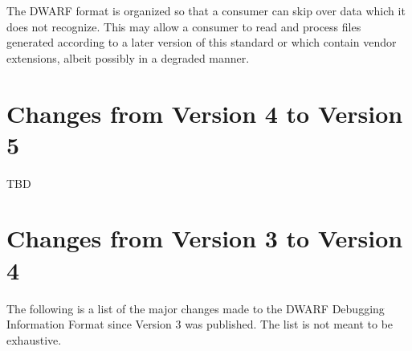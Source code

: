 The DWARF format is organized so that a consumer can skip over
data which it does not recognize. 
This may allow a consumer
to read and process files generated according to a later
version of this standard or which contain vendor extensions,
albeit possibly in a degraded manner.


\section[Changes Version 4 to 5]{Changes from Version 4 to Version 5}
TBD
\section[Changes Version 3 to 4]{Changes from Version 3 to Version 4}
The following is a list of the major changes made to the DWARF Debugging Information
Format since Version 3 was published. The list is not meant to be exhaustive.


